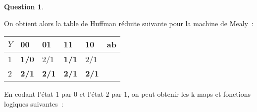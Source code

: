 \documentclass[11pt,a4paper]{article}
\theoremstyle{definition}%
\newtheorem{Q}{Question}[] %
\begin{document}
\begin{Q}
{\begin{enumerate}
		On obtient alors la table de Huffman réduite suivante pour la machine de Mealy~:

		\begin{center}
		\begin{tabular}{|l|l|l|l|l|l}
		\hline
		$Y$ & 00         & 01         & 11         & 10         & \multicolumn{1}{l|}{ab} \\ \hline
		1           & \textbf{1/0} & 2/1          & \textbf{1/1}          & 2/1          &  \\ \cline{1-5}
		2           & \textbf{2/1}          & \textbf{2/1} & \textbf{2/1} & \textbf{2/1} &  \\ \cline{1-5}
		\end{tabular}
		\end{center}

		En codant l'état $1$ par $0$ et l'état $2$ par $1$, on peut obtenir les k-maps et fonctions logiques suivantes~:
		\begin{center}

		\end{center}
	\end{enumerate}
}
\end{Q}
\end{document}
